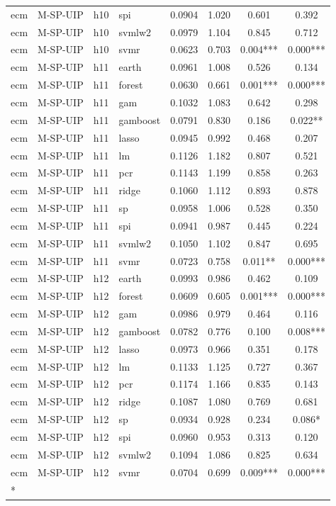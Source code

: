 \begin{ThreePartTable}
\begin{longtable}[t]{llclcccc}
ecm & M-SP-UIP & h10 & spi & 0.0904 & 1.020 & 0.601 & 0.392\\
ecm & M-SP-UIP & h10 & svmlw2 & 0.0979 & 1.104 & 0.845 & 0.712\\
ecm & M-SP-UIP & h10 & svmr & 0.0623 & 0.703 & 0.004*** & 0.000***\\
\addlinespace
ecm & M-SP-UIP & h11 & earth & 0.0961 & 1.008 & 0.526 & 0.134\\
ecm & M-SP-UIP & h11 & forest & 0.0630 & 0.661 & 0.001*** & 0.000***\\
ecm & M-SP-UIP & h11 & gam & 0.1032 & 1.083 & 0.642 & 0.298\\
ecm & M-SP-UIP & h11 & gamboost & 0.0791 & 0.830 & 0.186 & 0.022**\\
ecm & M-SP-UIP & h11 & lasso & 0.0945 & 0.992 & 0.468 & 0.207\\
ecm & M-SP-UIP & h11 & lm & 0.1126 & 1.182 & 0.807 & 0.521\\
ecm & M-SP-UIP & h11 & pcr & 0.1143 & 1.199 & 0.858 & 0.263\\
ecm & M-SP-UIP & h11 & ridge & 0.1060 & 1.112 & 0.893 & 0.878\\
ecm & M-SP-UIP & h11 & sp & 0.0958 & 1.006 & 0.528 & 0.350\\
ecm & M-SP-UIP & h11 & spi & 0.0941 & 0.987 & 0.445 & 0.224\\
ecm & M-SP-UIP & h11 & svmlw2 & 0.1050 & 1.102 & 0.847 & 0.695\\
ecm & M-SP-UIP & h11 & svmr & 0.0723 & 0.758 & 0.011** & 0.000***\\
\addlinespace
ecm & M-SP-UIP & h12 & earth & 0.0993 & 0.986 & 0.462 & 0.109\\
ecm & M-SP-UIP & h12 & forest & 0.0609 & 0.605 & 0.001*** & 0.000***\\
ecm & M-SP-UIP & h12 & gam & 0.0986 & 0.979 & 0.464 & 0.116\\
ecm & M-SP-UIP & h12 & gamboost & 0.0782 & 0.776 & 0.100 & 0.008***\\
ecm & M-SP-UIP & h12 & lasso & 0.0973 & 0.966 & 0.351 & 0.178\\
ecm & M-SP-UIP & h12 & lm & 0.1133 & 1.125 & 0.727 & 0.367\\
ecm & M-SP-UIP & h12 & pcr & 0.1174 & 1.166 & 0.835 & 0.143\\
ecm & M-SP-UIP & h12 & ridge & 0.1087 & 1.080 & 0.769 & 0.681\\
ecm & M-SP-UIP & h12 & sp & 0.0934 & 0.928 & 0.234 & 0.086*\\
ecm & M-SP-UIP & h12 & spi & 0.0960 & 0.953 & 0.313 & 0.120\\
ecm & M-SP-UIP & h12 & svmlw2 & 0.1094 & 1.086 & 0.825 & 0.634\\
ecm & M-SP-UIP & h12 & svmr & 0.0704 & 0.699 & 0.009*** & 0.000***\\*
\end{longtable}
\end{ThreePartTable}
\endgroup{}
